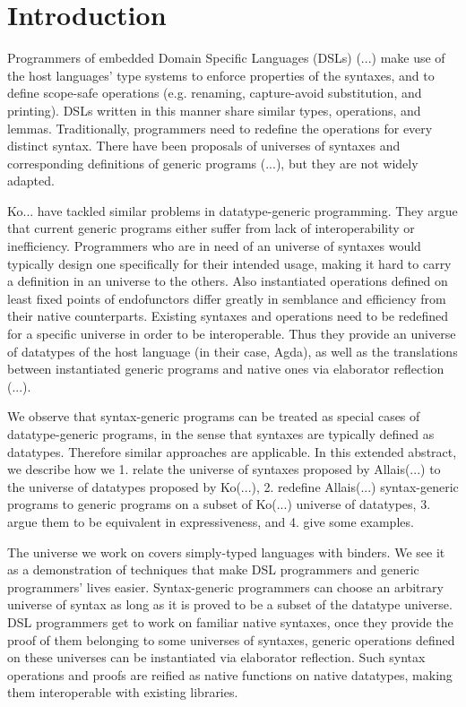 \documentclass[sigplan,review,fleqn]{acmart}
\begin{document}
\maketitle


\section{Introduction}
\label{sec:introduction}
Programmers of embedded Domain Specific Languages (DSLs) (...) make use of the host languages' type systems to enforce properties of the syntaxes, and to define scope-safe operations (e.g. renaming, capture-avoid substitution, and printing).
DSLs written in this manner share similar types, operations, and lemmas.
Traditionally, programmers need to redefine the operations for every distinct syntax.
There have been proposals of universes of syntaxes and corresponding definitions of generic programs (...), but they are not widely adapted.

Ko... have tackled similar problems in datatype-generic programming.
They argue that current generic programs either suffer from lack of interoperability or inefficiency.
Programmers who are in need of an universe of syntaxes would typically design one specifically for their intended usage, making it hard to carry a definition in an universe to the others.
Also instantiated operations defined on least fixed points of endofunctors differ greatly in semblance and efficiency from their native counterparts.
Existing syntaxes and operations need to be redefined for a specific universe in order to be interoperable.
Thus they provide an universe of datatypes of the host language (in their case, Agda), as well as the translations between instantiated generic programs and native ones via elaborator reflection (...).

We observe that syntax-generic programs can be treated as special cases of datatype-generic programs, in the sense that syntaxes are typically defined as datatypes.
Therefore similar approaches are applicable.
In this extended abstract, we describe how we
1. relate the universe of syntaxes proposed by Allais(...) to the universe of datatypes proposed by Ko(...),
2. redefine Allais(...) syntax-generic programs to generic programs on a subset of Ko(...) universe of datatypes,
3. argue them to be equivalent in expressiveness, and
4. give some examples.

The universe we work on covers simply-typed languages with binders. 
We see it as a demonstration of techniques that make DSL programmers and generic programmers' lives easier.
Syntax-generic programmers can choose an arbitrary universe of syntax as long as it is proved to be a subset of the datatype universe.
DSL programmers get to work on familiar native syntaxes, once they provide the proof of them belonging to some universes of syntaxes, generic operations defined on these universes can be instantiated via elaborator reflection.
Such syntax operations and proofs are reified as native functions on native datatypes, making them interoperable with existing libraries.
\end{document}
